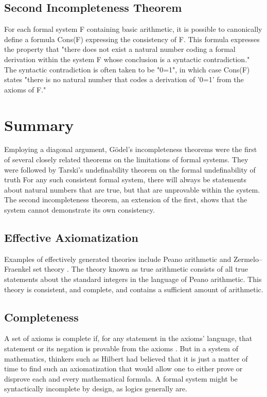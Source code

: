 \documentclass[a4paper,10pt]{article} %
\begin{document}
\subsection{Second Incompleteness Theorem  } 
For each formal system F containing basic arithmetic, it is possible to canonically define a formula Cons(F) expressing the consistency of F. This formula expresses the property that "there does not exist a natural number coding a formal derivation within the system F whose conclusion is a syntactic contradiction." The syntactic contradiction is often taken to be "0=1", in which case Cons(F) states "there is no natural number that codes a derivation of '0=1' from the axioms of F."   

\section{Summary}
Employing a diagonal argument, Gödel's incompleteness theorems were the first of several closely related theorems on the limitations of formal systems. They were followed by Tarski's undefinability theorem on the formal undefinability of truth
For any such consistent formal system, there will always be statements about natural numbers that are true, but that are unprovable within the system.
The second incompleteness theorem, an extension of the first, shows that the system cannot demonstrate its own consistency.

\subsection{Effective Axiomatization}


Examples of effectively generated theories include Peano arithmetic and Zermelo–Fraenkel set theory . The theory known as true arithmetic consists of all true statements about the standard integers in the language of Peano arithmetic. This theory is consistent, and complete, and contains a sufficient amount of arithmetic.

\subsection{Completeness}

A set of axioms is complete if, for any statement in the axioms' language, that statement or its negation is provable from the axioms . But in a system of mathematics, thinkers such as Hilbert had believed that it is just a matter of time to find such an axiomatization that would allow one to either prove or disprove each and every mathematical formula. A formal system might be syntactically incomplete by design, as logics generally are.
\end{document}
